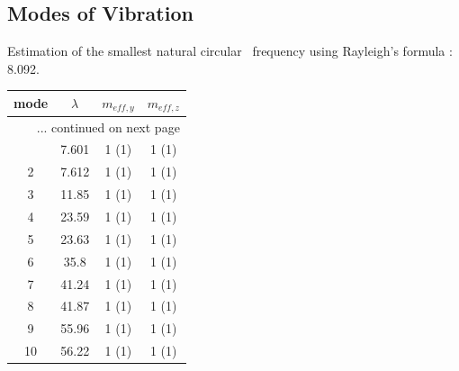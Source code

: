 \documentclass{article}%
\begin{document}
\subsection{Modes of Vibration}%
\label{subsec:ModesofVibration}%
Estimation of the smallest natural circular \
    frequency using Rayleigh's formula : 8.092.%
\begin{longtable}{| c | c | c c |}%
\hline%
mode&$\lambda$&$m_{eff,y}$&$m_{eff,z}$\\%
\hline%
\endhead%
\hline%
\multicolumn{4}{r}{... continued on next page}\\%
\endfoot%
\hline%
\endlastfoot%
1&7.601&1 (1)&1 (1)\\%
2&7.612&1 (1)&1 (1)\\%
3&11.85&1 (1)&1 (1)\\%
4&23.59&1 (1)&1 (1)\\%
5&23.63&1 (1)&1 (1)\\%
6&35.8&1 (1)&1 (1)\\%
7&41.24&1 (1)&1 (1)\\%
8&41.87&1 (1)&1 (1)\\%
9&55.96&1 (1)&1 (1)\\%
10&56.22&1 (1)&1 (1)\\%
\end{longtable}

%
\end{document}
